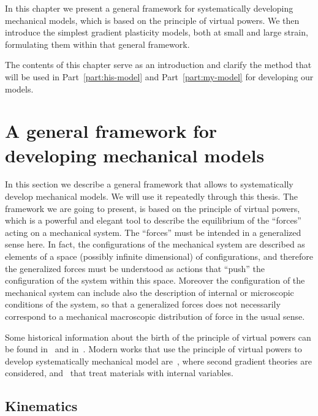 \documentclass[a4paper,10pt,twoside]{amsbook}
\numberwithin{section}{chapter}
\numberwithin{equation}{chapter}
\theoremstyle{definition}
\begin{document}
In this chapter we present a general framework for systematically developing mechanical models, which is based on the principle of virtual powers. We then introduce the simplest gradient plasticity models, both at small and large strain, formulating them within that general framework.

The contents of this chapter serve as an introduction and clarify the method that will be used in Part~\ref{part:his-model} and Part~\ref{part:my-model} for developing our models.

\section{A general framework for developing mechanical models}
\label{sec:ppv}

In this section we describe a general framework that allows to systematically develop mechanical models. We will use it repeatedly through this thesis. The framework we are going to present, is based on the principle of virtual powers, which is a powerful and elegant tool to describe the equilibrium of the ``forces'' acting on a mechanical system. The ``forces'' must be intended in a generalized sense here. In fact, the configurations of the mechanical system are described as elements of a space (possibly infinite dimensional) of configurations, and therefore the generalized forces must be understood as actions that ``push'' the configuration of the system within this space. Moreover the configuration of the mechanical system can include also the description of internal or microscopic conditions of the system, so that a generalized forces does not necessarily correspond to a mechanical macroscopic distribution of force in the usual sense.

Some historical information about the birth of the principle of virtual powers can be found in~\cite{ppv-encyclopedia} and in~\cite{ppv-maugin}. Modern works that use the principle of virtual powers to develop systematically mechanical model are~\cite{germain,gurtin-fried,gurtin-fried-turbulence}, where second gradient theories are considered, and~\cite{gurtin-anand-small,gurtin-anand-large,non-smooth-thermomechanics} that treat materials with internal variables.

\subsection{Kinematics}
\end{document}

